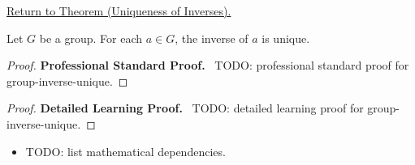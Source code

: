 \newpage
{}
\label{prf:group-inverse-unique}

\begin{remark*}[Return]
\hyperref[prop:group-inverse-unique]{Return to Theorem (Uniqueness of Inverses).}
\end{remark*}

\begin{theorem*}
Let $G$ be a group. For each $a \in G$, the inverse of $a$ is unique.
\end{theorem*}

\begin{proof}
\textbf{Professional Standard Proof.}~
TODO: professional standard proof for group-inverse-unique.
\end{proof}

\begin{proof}
\textbf{Detailed Learning Proof.}~
TODO: detailed learning proof for group-inverse-unique.
\end{proof}

\begin{remark*}
\end{remark*}

\begin{dependencies}
\begin{itemize}
  \item TODO: list mathematical dependencies.
\end{itemize}
\end{dependencies}

\clearpage
